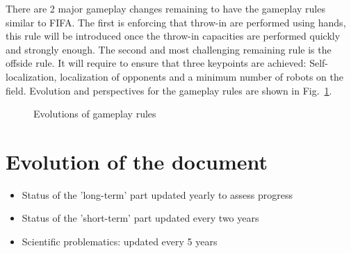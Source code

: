 \documentclass{article}
\begin{document}
There are 2 major gameplay changes remaining to have the gameplay rules similar to FIFA.
The first is enforcing that throw-in are performed using hands,
this rule will be introduced once the throw-in capacities are performed quickly and
strongly enough.
The second and most challenging remaining rule is the offside rule.
It will require to ensure that three keypoints are achieved:
Self-localization, localization of opponents and a minimum number of robots on the field.
Evolution and perspectives for the gameplay rules are shown in Fig.~\ref{fig:gameplay_rules}.

\begin{figure}
  \centering
  
  \caption{\label{fig:gameplay_rules}Evolutions of gameplay rules}
\end{figure}


\section{Evolution of the document}



\begin{itemize}
\item Status of the 'long-term' part updated yearly to assess progress
\item Status of the 'short-term' part updated every two years
\item Scientific problematics: updated every 5 years
\end{itemize}

\newpage

\printbibliography
\end{document}
